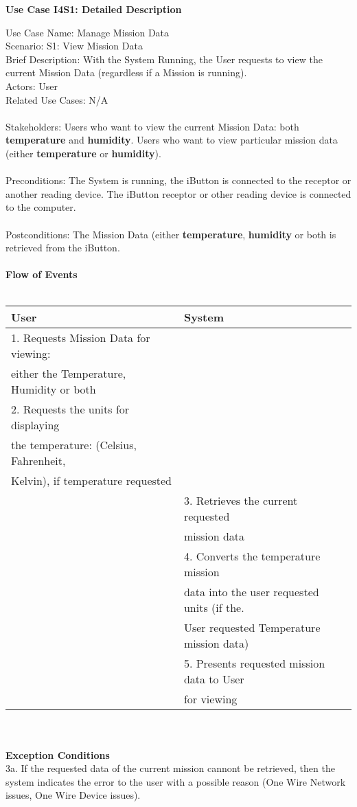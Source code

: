 \documentclass[letterpaper]{article}
\begin{document}
\noindent
\begin{center}
\textbf{Use Case I4S1:  Detailed Description}
\end{center}
Use Case Name:  Manage Mission Data\\
Scenario:  S1:  View Mission Data\\
Brief Description:  With the System Running, the User requests to view
the current Mission Data (regardless if a Mission is running).\\
Actors:  User\\
Related Use Cases: N/A\\\\
Stakeholders:  Users who want to view the current Mission Data:  both
\textbf{temperature} and \textbf{humidity}. Users
who want to view particular mission data (either \textbf{temperature}
or \textbf{humidity}).\\\\
Preconditions:  The System is running, the iButton is connected to
the receptor or another reading device.  The iButton receptor or
other reading device is connected to the computer.\\\\
Postconditions:  The Mission Data (either \textbf{temperature},
\textbf{humidity} or both is retrieved from the iButton.\\\\
\textbf{Flow of Events}\\\\
\begin{tabular}{|l|l|}\hline
\textbf{User} & \textbf{System}\\\hline
1.  Requests Mission Data for viewing: & \\
either the Temperature, Humidity or both & \\\hline
2.  Requests the units for displaying  & \\
the temperature: (Celsius, Fahrenheit, & \\
Kelvin), if temperature requested & \\\hline
& 3. Retrieves the current requested \\
& mission data \\\hline
& 4.  Converts the temperature mission\\
& data into the user requested units (if the.\\
& User requested Temperature mission data)\\\hline
& 5.  Presents requested mission data to User\\
& for viewing\\\hline
\end{tabular}\\\\
\textbf{Exception Conditions}\\
3a.  If the requested data of the current mission cannont be
retrieved, then the system indicates the error to the user with a
possible reason (One Wire Network issues, One Wire Device issues).
\end{document}
